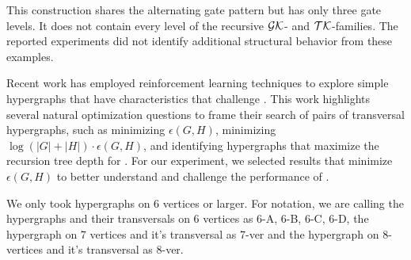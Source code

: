 This construction shares the alternating gate pattern but has only three gate levels. It does not contain every level of the recursive $\mathcal{GK}$- and $\mathcal{TK}$-families. The reported experiments did not identify additional structural behavior from these examples.

Recent work \cite{SS24} has employed reinforcement learning techniques to explore simple hypergraphs that have characteristics that challenge \FKA. This work highlights several natural optimization questions to frame their search of pairs of transversal hypergraphs, such as minimizing $\epsilon(G,H)$, minimizing $\log(|G|+|H|)\cdot\epsilon(G,H)$, and identifying hypergraphs that maximize the recursion tree depth for \FKA. For our experiment, we selected results that minimize $\epsilon(G,H)$ to better understand and challenge the performance of \FKA.

We only took hypergraphs on 6 vertices or larger. For notation, we are calling the hypergraphs and their transversals on 6 vertices as 6-A, 6-B, 6-C, 6-D, the hypergraph on 7 vertices and it's transversal as 7-ver and the hypergraph on 8-vertices and it's transversal as 8-ver.

